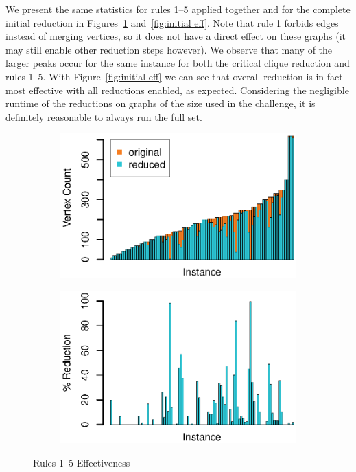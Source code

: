 \documentclass[12pt,oneside,english,parskip=full,headings=small]{scrbook}
\theoremstyle{definition}
\begin{document}
We present the same statistics for rules 1--5 applied together and for the complete initial
reduction in Figures~\ref{fig:rules1-5 eff} and~\ref{fig:initial eff}. Note that rule 1 forbids
edges instead of merging vertices, so it does not have a direct effect on these graphs (it may still
enable other reduction steps however). We observe that many of the larger peaks occur for the same
instance for both the critical clique reduction and rules 1--5. With Figure~\ref{fig:initial eff} we
can see that overall reduction is in fact most effective with all reductions enabled, as expected.
Considering the negligible runtime of the reductions on graphs of the size used in the challenge, it
is definitely reasonable to always run the full set.

\begin{figure}[h]
	\begin{subfigure}{0.49\textwidth}
		\includegraphics[width=1.0\linewidth]{rules1-5_absolute}
	\end{subfigure}
	\begin{subfigure}{0.49\textwidth}
		\includegraphics[width=1.0\linewidth]{rules1-5_percent}
	\end{subfigure}
	\caption{Rules 1--5 Effectiveness}
	\label{fig:rules1-5 eff}
\end{figure}
\end{document}
